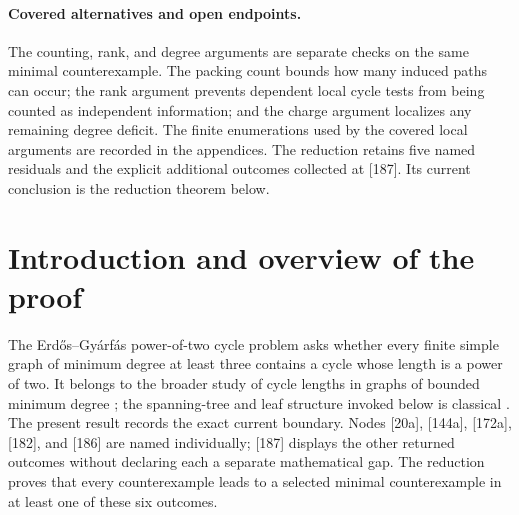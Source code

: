 \documentclass[11pt]{article}
\begin{document}
\paragraph{Covered alternatives and open endpoints.}
The counting, rank, and degree arguments are separate checks on the same
minimal counterexample.  The packing count bounds how many induced paths can
occur; the rank argument prevents dependent local cycle tests from being
counted as independent information; and the charge argument localizes any
remaining degree deficit.  The finite enumerations used by the covered local
arguments are recorded in the appendices.  The reduction retains five named
residuals and the explicit additional outcomes collected at [187].  Its
current conclusion is the reduction theorem below.


\section{Introduction and overview of the proof}\label{sec:intro}

The Erd\H{o}s--Gy\'arf\'as power-of-two cycle problem asks whether every
finite simple graph of minimum degree at least three contains a cycle whose
length is a power of two.  It belongs to the broader study of cycle lengths
in graphs of bounded minimum degree \cite{BondyVince,GaoMa}; the spanning-tree
and leaf structure invoked below is classical \cite{KleitmanWest}.
The present result records the exact current boundary.  Nodes [20a], [144a],
[172a], [182], and [186] are named individually; [187] displays the other
returned outcomes without declaring each a separate mathematical gap.  The
reduction proves that every counterexample leads to a selected minimal
counterexample in at least one of these six outcomes.
\end{document}
